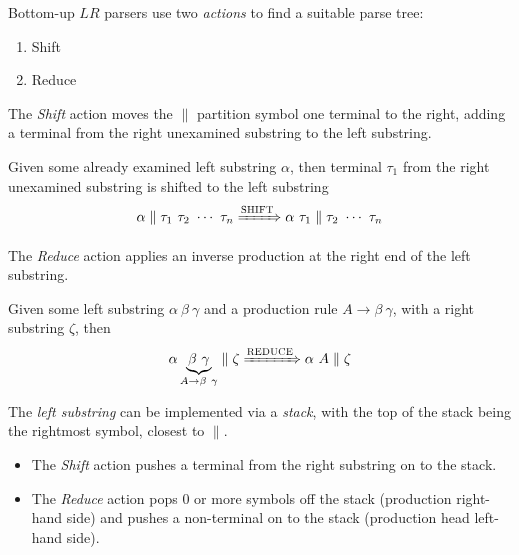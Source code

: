 \begin{definition}[$LR$ Actions]
    Bottom-up $LR$ parsers use two \textit{actions} to find a suitable parse tree:
    \begin{enumerate}
        \item Shift
        \item Reduce
    \end{enumerate}
\end{definition}

\begin{definition}[Shift]
    The \textit{Shift} action moves the $\parallel$ partition symbol one terminal to the right, adding a terminal from the right unexamined substring to the left substring.
    
    Given some already examined left substring $\alpha$, then terminal $\tau_1$ from the right unexamined substring is shifted to the left substring
    \begin{equation}
        \alpha \parallel \tau_1\ \tau_2\ \cdots\ \tau_n \xRightarrow{\textsc{SHIFT}} \alpha\ \tau_1 \parallel \tau_2\ \cdots\ \tau_n
    \end{equation}
\end{definition}

\begin{definition}[Reduce]
    The \textit{Reduce} action applies an inverse production at the right end of the left substring.
    
    Given some left substring $\alpha\ \beta\ \gamma$ and a production rule $A \to \beta\ \gamma$, with a right substring $\zeta$, then
    \begin{equation}
        \alpha \underbrace{\beta\ \gamma}_{A \to \beta\ \gamma} \parallel \zeta \xRightarrow{\textsc{REDUCE}} \alpha\ A \parallel \zeta
    \end{equation}
\end{definition}

\begin{definition}
    The \textit{left substring} can be implemented via a \textit{stack}, with the top of the stack being the rightmost symbol, closest to $\parallel$.
    \begin{itemize}
        \item The \textit{Shift} action pushes a terminal from the right substring on to the stack.
        \item The \textit{Reduce} action pops 0 or more symbols off the stack (production right-hand side) and pushes a non-terminal on to the stack (production head left-hand side).
    \end{itemize}
\end{definition}


